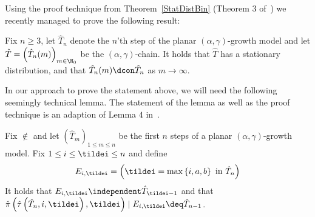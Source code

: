 %
Using the proof technique from Theorem~\ref{StatDistBin} (Theorem 3 of~\cite{RefWorks:doc:5b4cbc93e4b07f5746e47014}) we recently managed to prove the following result:
%
\begin{thm}\label{StationarityTheorem}
  Fix $n \geq 3$, let $\hat{T}_n$ denote the $n$'th step of the planar $(\alpha, \gamma)$-growth model and let $\hat{T} = {\left( \hat{T}_n(m) \right)}_{m \in \N_0}$ be the $(\alpha, \gamma)$-chain.
  It holds that $\hat{T}$ has a stationary distribution, and that $\hat{T}_n(m) \dcon \hat{T}_n$ as $m \to \infty$.
\end{thm}
%
In our approach to prove the statement above, we will need the following seemingly technical lemma.
The statement of the lemma as well as the proof technique is an adaption of Lemma $4$ in~\cite{RefWorks:doc:5b4cbc93e4b07f5746e47014}.
%
\begin{lemma}\label{StatImportantLemma}
  Fix $\nin$ and let ${\left( \hat{T}_m \right)}_{1 \leq m \leq  n}$ be the first $n$ steps of a planar $(\alpha, \gamma)$-growth model.
    Fix $1 \leq i \leq \tildei \leq n$ and define
    \begin{align}
        E_{i, \tildei} = \left( \tildei = \max\left\{ i, a, b \right\}\ \text{in}\ \hat{T}_n \right)
        \label{LemmaEii}
    \end{align}
    It holds that $E_{i, \tildei} \independent \hat{T}_{\tildei - 1}$ and that $\hat{\pi} \left( \hat{\tau} \left( \hat{T}_n, i, \tildei \right), \tildei \right) \mid E_{i, \tildei} \deq \hat{T}_{n-1}$.
\end{lemma}
%
